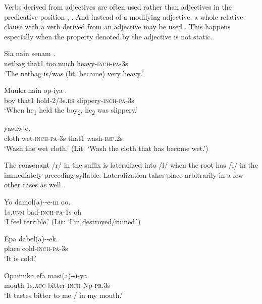Verbs derived from adjectives are often used rather than adjectives in the predicative position , . And instead of a modifying adjective, a whole relative clause with a verb derived from an adjective may be used . This happens especially when the property denoted by the adjective is not static. 

\ea%
\label{ex:3:x82}
\gll Sia nain senam . \\
netbag that1 too.much heavy-\textsc{inch}-\textsc{pa}-3s\\
\glt`The netbag is/was (lit: became) very heavy.' 
\z

\ea%
\label{ex:3:x1764}
\gll Muuka nain op-iya \textstyleEmphasizedVernacularWords{-}\textstyleEmphasizedVernacularWords{-}. \\
boy that1 hold-2/3s.\textsc{ds} slippery-\textsc{inch}-\textsc{pa}-3s\\
\glt`When he\textsubscript{1} held the boy\textsubscript{2}, he\textsubscript{2} was slippery.'
\z

\ea%
\label{ex:3:x83}
 yasuw-e. \\
cloth wet-\textsc{inch}-\textsc{pa}-3s that1 wash-\textsc{imp}.2s\\
\glt`Wash the wet cloth.' (Lit: `Wash the cloth that has become wet.')
\z

The consonant /r/ in the suffix is lateralized into /l/ when the root has /l/ in the immediately preceding syllable. Lateralization takes place arbitrarily in a few other cases as well .

\ea%
\label{ex:3:x197}
\gll Yo damol(a)--e-m oo. \\
1s.\textsc{unm} bad-\textsc{inch}-\textsc{pa}-1s oh \\
\glt`I feel terrible.' (Lit: `I'm destroyed/ruined.') 
\z

\ea%
\label{ex:3:x198}
\gll Epa dabel(a)--ek. \\
place cold-\textsc{inch}-\textsc{pa}-3s \\
\glt`It is cold.'
\z

\ea%
\label{ex:3:x199}
\gll Opaimika efa masi(a)--i-ya. \\
mouth 1s.\textsc{acc} bitter-\textsc{inch}-Np-\textsc{pr}.3s \\
\glt`It tastes bitter to me / in my mouth.'
\z

